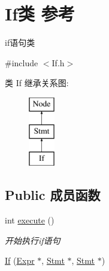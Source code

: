 \hypertarget{class_if}{}\section{If类 参考}
\label{class_if}


if语句类  




{\ttfamily \#include $<$If.\+h$>$}

类 If 继承关系图\+:\begin{figure}[H]
\begin{center}
\leavevmode
\includegraphics[height=3.000000cm]{class_if}
\end{center}
\end{figure}
\subsection*{Public 成员函数}
\begin{DoxyCompactItemize}
\item 
\mbox{\label{class_if_aeadf929258ccd07a239879c118fb152f}} 
int \hyperlink{class_if_aeadf929258ccd07a239879c118fb152f}{execute} ()
\begin{DoxyCompactList}\small\item\em 开始执行if语句 \end{DoxyCompactList}\item 
\hyperlink{class_if_a398387169436db838e9935b985a8f4a9}{If} (\hyperlink{class_expr}{Expr} $\ast$, \hyperlink{class_stmt}{Stmt} $\ast$, \hyperlink{class_stmt}{Stmt} $\ast$)
\end{DoxyCompactItemize}
